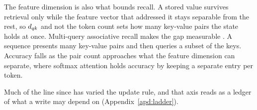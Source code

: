 The feature dimension is also what bounds recall. A stored value survives retrieval only while the feature vector that addressed it stays separable from the rest, so $d_{qk}$ and not the token count sets how many key-value pairs the state holds at once. Multi-query associative recall makes the gap measurable \citep{arora2023zoology}. A sequence presents many key-value pairs and then queries a subset of the keys. Accuracy falls as the pair count approaches what the feature dimension can separate, where softmax attention holds accuracy by keeping a separate entry per token.

Much of the line since has varied the update rule, and that axis reads as a ledger of what a write may depend on (Appendix~\ref{apd:ladder}).
